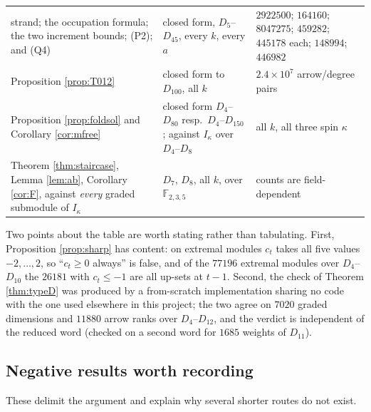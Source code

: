 \documentclass[reqno]{amsart}
\theoremstyle{plain}
\theoremstyle{definition}
\newcommand{\ka}{\kappa}
\begin{document}
\begin{center}
\begin{tabular}{p{}p{}p{}}
 strand; the occupation formula; the two increment bounds; \textup{(P2)}; and
 \textup{(Q4)} &
 closed form, $D_5$--$D_{45}$, every $k$, every $a$ &
 $2922500$; $164160$; $8047275$; $459282$; $445178$ each; $148994$; $446982$\\
Proposition \ref{prop:T012} & closed form to $D_{100}$, all $k$ &
 $2.4\times10^{7}$ arrow/degree pairs\\
Proposition \ref{prop:foldsol} and Corollary \ref{cor:mfree} &
 closed form $D_4$--$D_{80}$ resp.\ $D_4$--$D_{150}$; against $I_\ka$ over
 $D_4$--$D_8$ & all $k$, all three spin $\ka$\\
Theorem \ref{thm:staircase}, Lemma \ref{lem:ab}, Corollary \ref{cor:F},
 against \emph{every} graded submodule of $I_\ka$ &
 $D_7$, $D_8$, all $k$, over $\mathbb{F}_{2,3,5}$ &
 counts are field-dependent\\
\hline
\end{tabular}
\end{center}

Two points about the table are worth stating rather than tabulating.  First,
Proposition \ref{prop:sharp} has content: on extremal modules $c_t$ takes all
five values $-2,\dots,2$, so ``$c_t\ge0$ always'' is false, and of the $77196$
extremal modules over $D_4$--$D_{10}$ the $26181$ with $c_t\le-1$ are all
up-sets at $t-1$.  Second, the check of Theorem \ref{thm:typeD} was produced by
a from-scratch implementation sharing no code with the one used elsewhere in
this project; the two agree on $7020$ graded dimensions and $11880$ arrow ranks
over $D_4$--$D_{12}$, and the verdict is independent of the reduced word
(checked on a second word for $1685$ weights of $D_{11}$).

\subsection{Negative results worth recording}\label{ss:negative}
These delimit the argument and explain why several shorter routes do not exist.
\end{document}
